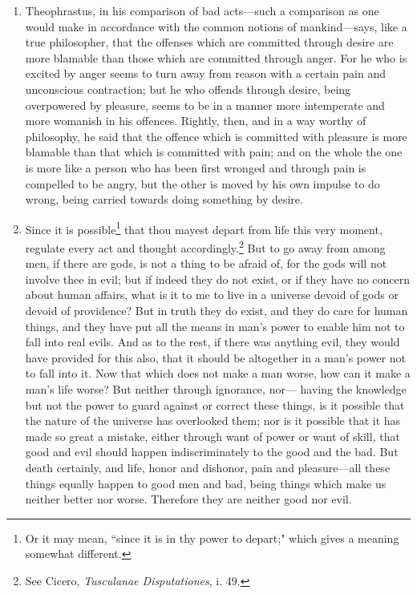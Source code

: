 \begin{enumerate}
\item Theophrastus, in his comparison of bad acts—such a comparison as one would make in accordance with the common notions of mankind—says, like a true philosopher, that the offenses which are committed through desire are more blamable than those which are committed through anger. For he who is excited by anger seems to turn away from reason with a certain pain and unconscious contraction; but he who offends through desire, being overpowered by pleasure, seems to be in a manner more intemperate and more womanish in his offences. Rightly, then, and in a way worthy of philosophy, he said that the offence which is committed with pleasure is more blamable than that which is committed with pain; and on the whole the one is more like a person who has been first wronged and through pain is compelled to be angry, but the other is moved by his own impulse to do wrong, being carried towards doing something by desire.

\item Since it is possible\footnote{Or it may mean, ``since it is in thy power to depart;" which gives a meaning somewhat different.} that thou mayest depart from life this very moment, regulate every act and thought accordingly.\footnote{See Cicero, \textit{Tusculanae Disputationes}, i. 49.} But to go away from among men, if there are gods, is not a thing to be afraid of, for the gods will not involve thee in evil; but if indeed they do not exist, or if they have no concern about human affairs, what is it to me to live in a universe devoid of gods or devoid of providence? But in truth they do exist, and they do care for human things, and they have put all the means in man's power to enable him not to fall into real evils. And as to the rest, if there was anything evil, they would have provided for this also, that it should be altogether in a man's power not to fall into it. Now that which does not make a man worse, how can it make a man's life worse? But neither through ignorance, nor— having the knowledge but not the power to guard against or correct these things, is it possible that the nature of the universe has overlooked them; nor is it possible that it has made so great a mistake, either through want of power or want of skill, that good and evil should happen indiscriminately to the good and the bad. But death certainly, and life, honor and dishonor, pain and pleasure—all these things equally happen to good men and bad, being things which make us neither better nor worse. Therefore they are neither good nor evil.


\end{enumerate}
